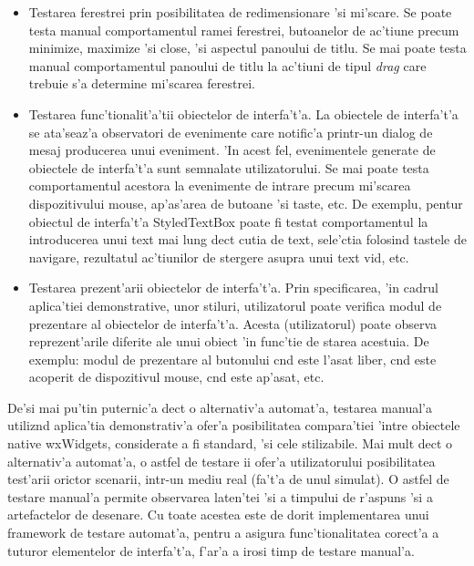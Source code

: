 \begin{itemize}
\item Testarea ferestrei prin posibilitatea de redimensionare 'si mi'scare. Se poate testa manual comportamentul ramei ferestrei, butoanelor de ac'tiune precum minimize, maximize 'si close, 'si aspectul panoului de titlu. Se mai poate testa manual comportamentul panoului de titlu la ac'tiuni de tipul \emph{drag} care trebuie s'a determine mi'scarea ferestrei.
\item Testarea func'tionalit'a'tii obiectelor de interfa't'a. La obiectele de interfa't'a se ata'seaz'a observatori de evenimente care notific'a printr-un dialog de mesaj producerea unui eveniment. 'In acest fel, evenimentele generate de obiectele de interfa't'a sunt semnalate utilizatorului. Se mai poate testa comportamentul acestora la evenimente de intrare precum mi'scarea dispozitivului mouse, ap'as'area de butoane 'si taste, etc. De exemplu, pentur obiectul de interfa't'a StyledTextBox poate fi testat comportamentul la introducerea unui text mai lung dec{\ia}t cutia de text, sele'ctia folosind tastele de navigare, rezultatul ac'tiunilor de stergere asupra unui text vid, etc.
\item Testarea prezent'arii obiectelor de interfa't'a. Prin specificarea, 'in cadrul aplica'tiei demonstrative, unor stiluri, utilizatorul poate verifica modul de prezentare al obiectelor de interfa't'a. Acesta (utilizatorul) poate observa reprezent'arile diferite ale unui obiect 'in func'tie de starea acestuia. De exemplu: modul de prezentare al butonului c{\ia}nd este l'asat liber, c{\ia}nd este acoperit de dispozitivul mouse, c{\ia}nd este ap'asat, etc.
\end{itemize}

De'si mai pu'tin puternic'a dec{\ia}t o alternativ'a automat'a, testarea manual'a utiliz{\ia}nd aplica'tia demonstrativ'a ofer'a posibilitatea compara'tiei 'intre obiectele native wxWidgets, considerate a fi standard, 'si cele stilizabile. Mai mult dec{\ia}t o alternativ'a automat'a, o astfel de testare ii ofer'a utilizatorului posibilitatea test'arii oric{\ia}tor scenarii, intr-un mediu real (fa't'a de unul simulat). O astfel de testare manual'a permite observarea laten'tei 'si a timpului de r'aspuns 'si a artefactelor de desenare. Cu toate acestea este de dorit implementarea unui framework de testare automat'a, pentru a asigura func'tionalitatea corect'a a tuturor elementelor de interfa't'a, f'ar'a a irosi timp de testare manual'a.